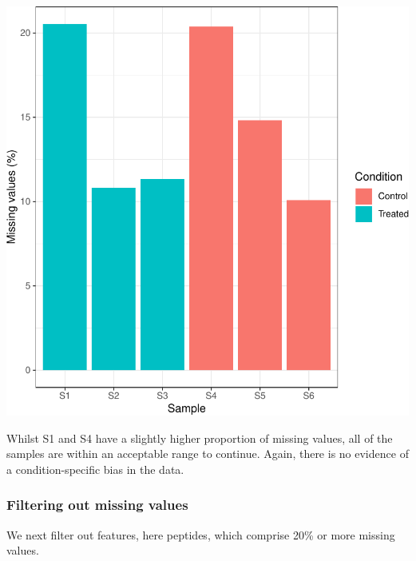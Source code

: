 \documentclass[9pt,a4paper,]{extarticle}
\newenvironment{Shaded}{\begin{snugshade}}{\end{snugshade}}
\newcommand{\DocumentationTok}[1]{\textcolor[rgb]{0.56,0.35,0.01}{\textbf{\textit{#1}}}}
\newcommand{\FloatTok}[1]{\textcolor[rgb]{0.00,0.00,0.81}{#1}}
\newcommand{\FunctionTok}[1]{\textcolor[rgb]{0.13,0.29,0.53}{\textbf{#1}}}
\newcommand{\NormalTok}[1]{#1}
\newcommand{\SpecialCharTok}[1]{\textcolor[rgb]{0.81,0.36,0.00}{\textbf{#1}}}
\newcommand{\StringTok}[1]{\textcolor[rgb]{0.31,0.60,0.02}{#1}}
\begin{document}
\begin{center}\includegraphics[height=0.4\textheight]{workflow_expressions_files/figure-latex/lfq_missing_data_2-1} \end{center}

Whilst S1 and S4 have a slightly higher proportion of missing values, all of the
samples are within an acceptable range to continue. Again, there is no evidence
of a condition-specific bias in the data.

\subsubsection{Filtering out missing values}\label{filtering-out-missing-values-1}

We next filter out features, here peptides, which comprise 20\% or more missing
values.

\begin{Shaded}
\end{Shaded}
\end{document}
